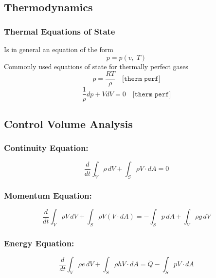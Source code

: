 \subsection*{Thermodynamics}

\subsubsection*{Thermal Equations of State}
	Is in general an equation of the form
	\begin{equation}
		p=p(v,\;T)
	\end{equation}
	Commonly used equations of state for thermally perfect gases
	\begin{equation}
		p = \frac{RT}{\rho} \quad \texttt{[therm perf]}
	\end{equation}
	\begin{equation}
		\frac{1}{\rho} dp + V dV = 0 \quad \texttt{[therm perf]}
	\end{equation}

\subsection*{Control Volume Analysis}

\subsubsection*{Continuity Equation:}

\begin{equation}
	\frac{d}{dt} \int_V \rho \, dV + \int_S \rho V \cdot dA = 0
\end{equation}

\subsubsection*{Momentum Equation:}

\begin{equation}
	\frac{d}{dt} \int_V \rho V \, dV + \int_S \rho V (V \cdot dA) = - \int_S p \, dA + \int_V \rho g \, dV
\end{equation}

\subsubsection*{Energy Equation:}

\begin{equation}
	\frac{d}{dt} \int_V \rho e \, dV + \int_S \rho h V \cdot dA = \dot{Q} - \int_S p V \cdot dA
\end{equation}

